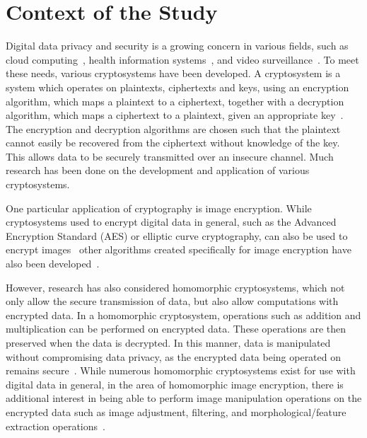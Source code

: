 
\section{Context of the Study}

Digital data privacy and security is a growing concern in various fields, such as cloud computing~\cite{potey_homomorphic_2016}, health information systems~\cite{kester_cryptographic_2015}, and video surveillance~\cite{upmanyu_efficient_2009}. To meet these needs, various cryptosystems have been developed. A cryptosystem is a system which operates on plaintexts, ciphertexts and keys, using an encryption algorithm, which maps a plaintext to a ciphertext, together with a decryption algorithm, which maps a ciphertext to a plaintext, given an appropriate key~\cite{bauer_cryptosystem_2005}. The encryption and decryption algorithms are chosen such that the plaintext cannot easily be recovered from the ciphertext without knowledge of the key. This allows data to be securely transmitted over an insecure channel. Much research has been done on the development and application of various cryptosystems.

One particular application of cryptography is image encryption. While cryptosystems used to encrypt digital data in general, such as the Advanced Encryption Standard (AES) or elliptic curve cryptography, can also be used to encrypt images~\cite{jain_image_2016, singh_image_2015} other algorithms created specifically for image encryption have also been developed~\cite{murugan_survey_2018}.

However, research has also considered homomorphic cryptosystems, which not only allow the secure transmission of data, but also allow computations with encrypted data. In a homomorphic cryptosystem, operations such as addition and multiplication can be performed on encrypted data. These operations are then preserved when the data is decrypted. In this manner, data is manipulated without compromising data privacy, as the encrypted data being operated on remains secure~\cite{fontaine_survey_2007, sen_homomorphic_2013}. While numerous homomorphic cryptosystems exist for use with digital data in general, in the area of homomorphic image encryption, there is additional interest in being able to perform image manipulation operations on the encrypted data such as image adjustment, filtering, and morphological/feature extraction operations~\cite{ziad_cryptoimg:_2016, gonzalez_digital_2008}.
